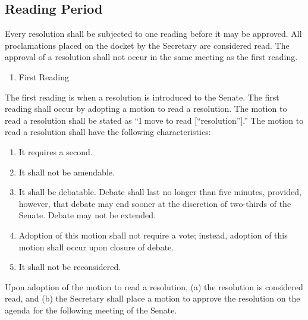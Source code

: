 \documentclass[12pt]{scrreprt}
\begin{document}
\subsection{Reading Period}
Every resolution  shall be subjected to one reading before it may be approved. All
proclamations placed on the docket by the Secretary are considered read. The approval of a resolution shall not occur in the same meeting as the first reading.
\begin{enumerate} 
    \item First Reading 
\end{enumerate}
The first reading is when a resolution is introduced to the Senate. The first reading shall occur by adopting a motion to read a resolution. The motion to read a resolution shall be stated as “I move to read
[“resolution”].” The motion to read a resolution shall have the following characteristics:
\begin{enumerate}
    \item It requires a second.
    \item It shall not be amendable.
    \item It shall be debatable. Debate shall last no longer than five minutes, provided, however,
that debate may end sooner at the discretion of two-thirds of the Senate. Debate may
not be extended.
    \item Adoption of this motion shall not require a vote; instead, adoption of this motion shall
occur upon closure of debate.
    \item It shall not be reconsidered.
\end{enumerate}
Upon adoption of the motion to read a resolution, (a) the resolution is considered read, and (b) the Secretary
shall place a motion to approve the resolution on the agenda for the following meeting of the Senate.
\end{document}
